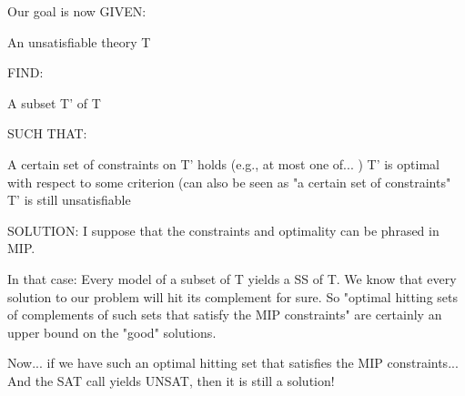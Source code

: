 Our goal is now
GIVEN:


	
An unsatisfiable theory T

FIND:


	
A subset T' of T

SUCH THAT:


	
A certain set of constraints on T' holds  (e.g., at most one of... ) 
	T' is optimal with respect to some criterion (can also be seen as "a certain set of constraints"
	T' is still unsatisfiable 
	
	
	SOLUTION:
I suppose that the constraints and optimality can be phrased in MIP. 
	
	In that case: 
Every model of a subset of T yields a SS of T. 
We know that every solution to our problem will hit its complement for sure.  
So "optimal hitting sets of complements of such sets that satisfy the MIP constraints" are certainly an upper bound on the "good" solutions. 

Now... if we have such an optimal hitting set that satisfies the MIP constraints... 
And the SAT call yields UNSAT, then it is still a solution! 

